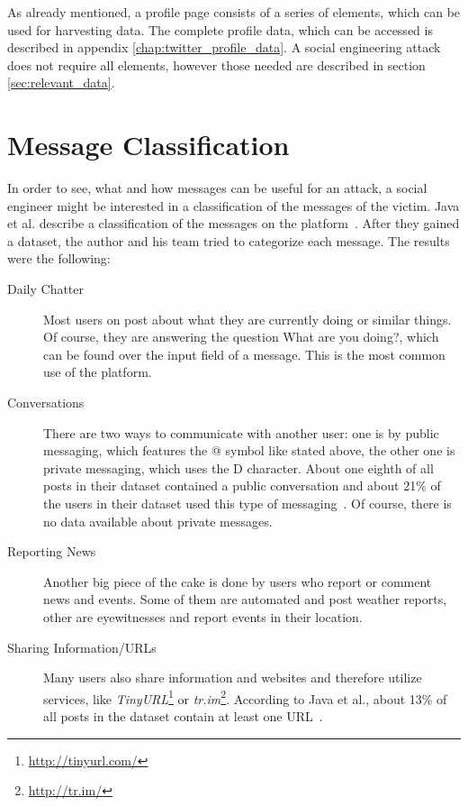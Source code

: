 As already mentioned, a \Twitter{} profile page consists of a series of
elements, which can be used for harvesting data. The complete profile data,
which can be accessed is described in appendix \ref{chap:twitter_profile_data}.
A social engineering attack does not require all elements, however those needed
are described in section \ref{sec:relevant_data}.

\section{Message Classification}

In order to see, what and how messages can be useful for an attack, a social
engineer might be interested in a classification of the messages of the victim.
Java et al. describe a classification of the messages on the \Twitter{}
platform~\cite{java2007}. After they gained a dataset, the author and his team
tried to categorize each message. The results were the following:

\begin{description}

\item[Daily Chatter]
Most users on \Twitter{} post about what they are currently doing or similar
things. Of course, they are answering the question \glqq{}What are you
doing?\grqq{}, which can be found over the input field of a message. This is
the most common use of the \Twitter{} platform.

\item[Conversations]
There are two ways to communicate with another user: one is by public
messaging, which features the @ symbol like stated above, the other one is
private messaging, which uses the D character. About one eighth of all posts
in their dataset contained a public conversation and about 21\% of the users in
their dataset used this type of messaging~\cite{java2007}. Of course, there is
no data available about private messages.

\item[Reporting News]
Another big piece of the cake is done by users who report or comment news and
events. Some of them are automated and post weather reports, other are
eyewitnesses and report events in their location.

\item[Sharing Information/URLs]
Many users also share information and websites and therefore utilize services,
like \textit{TinyURL}\footnote{\url{http://tinyurl.com/}} or
\textit{tr.im}\footnote{\url{http://tr.im/}}. According to Java et al.,
about 13\% of all posts in the dataset contain at least one URL~\cite{java2007}.

\end{description}


